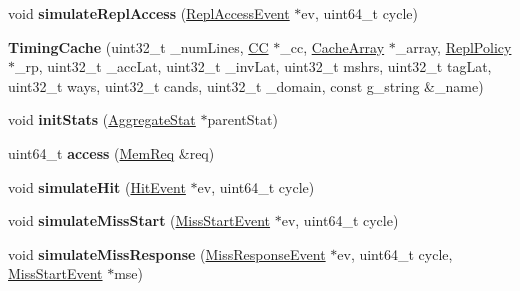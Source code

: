\begin{DoxyCompactItemize}
\item 
\hypertarget{classTimingCache_a7f073cf69fdac72bad8441c8bc5c3d62}{void {\bfseries simulate\-Repl\-Access} (\hyperlink{classReplAccessEvent}{Repl\-Access\-Event} $\ast$ev, uint64\-\_\-t cycle)}\label{classTimingCache_a7f073cf69fdac72bad8441c8bc5c3d62}

\item 
\hypertarget{classTimingCache_a862b430cb85b75ddf4bbb8038f7c15e5}{{\bfseries Timing\-Cache} (uint32\-\_\-t \-\_\-num\-Lines, \hyperlink{classCC}{C\-C} $\ast$\-\_\-cc, \hyperlink{classCacheArray}{Cache\-Array} $\ast$\-\_\-array, \hyperlink{classReplPolicy}{Repl\-Policy} $\ast$\-\_\-rp, uint32\-\_\-t \-\_\-acc\-Lat, uint32\-\_\-t \-\_\-inv\-Lat, uint32\-\_\-t mshrs, uint32\-\_\-t tag\-Lat, uint32\-\_\-t ways, uint32\-\_\-t cands, uint32\-\_\-t \-\_\-domain, const g\-\_\-string \&\-\_\-name)}\label{classTimingCache_a862b430cb85b75ddf4bbb8038f7c15e5}

\item 
\hypertarget{classTimingCache_a9583021c6cd082d567a4b9e7f41ab2f6}{void {\bfseries init\-Stats} (\hyperlink{classAggregateStat}{Aggregate\-Stat} $\ast$parent\-Stat)}\label{classTimingCache_a9583021c6cd082d567a4b9e7f41ab2f6}

\item 
\hypertarget{classTimingCache_abb38c207c0421313352ba62bda3d6ac1}{uint64\-\_\-t {\bfseries access} (\hyperlink{structMemReq}{Mem\-Req} \&req)}\label{classTimingCache_abb38c207c0421313352ba62bda3d6ac1}

\item 
\hypertarget{classTimingCache_ae98f61c668a3cdf2bad116e15af963a0}{void {\bfseries simulate\-Hit} (\hyperlink{classHitEvent}{Hit\-Event} $\ast$ev, uint64\-\_\-t cycle)}\label{classTimingCache_ae98f61c668a3cdf2bad116e15af963a0}

\item 
\hypertarget{classTimingCache_ac32b5bc9d2b3a18e551bba9e3a332242}{void {\bfseries simulate\-Miss\-Start} (\hyperlink{classMissStartEvent}{Miss\-Start\-Event} $\ast$ev, uint64\-\_\-t cycle)}\label{classTimingCache_ac32b5bc9d2b3a18e551bba9e3a332242}

\item 
\hypertarget{classTimingCache_a77a6afaecb3c06558bd36cb0cfee02ac}{void {\bfseries simulate\-Miss\-Response} (\hyperlink{classMissResponseEvent}{Miss\-Response\-Event} $\ast$ev, uint64\-\_\-t cycle, \hyperlink{classMissStartEvent}{Miss\-Start\-Event} $\ast$mse)}\label{classTimingCache_a77a6afaecb3c06558bd36cb0cfee02ac}


\end{DoxyCompactItemize}
